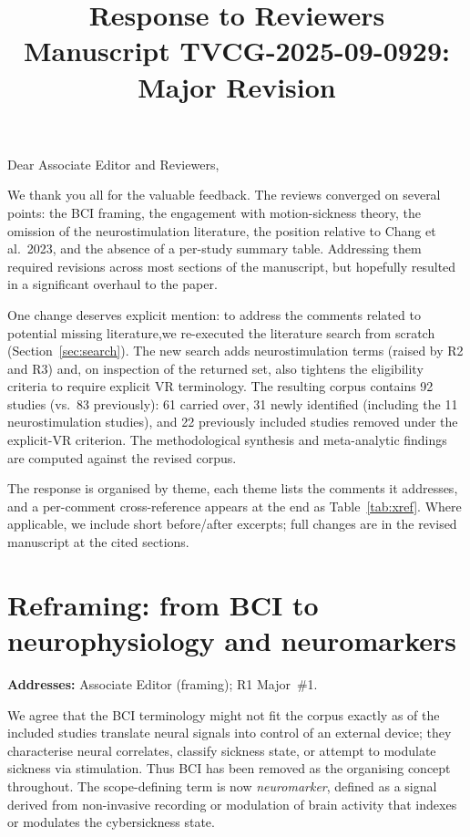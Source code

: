\documentclass[11pt,a4paper]{article}
\title{\vspace{-2em}Response to Reviewers\\[0.3em]
  \large Manuscript TVCG-2025-09-0929: Major Revision}
\author{}
\date{}
\newcommand{\addresses}[1]{\par\noindent\textbf{\small Addresses:} {\small #1}\par\smallskip}
\begin{document}
\maketitle
\vspace{-3em}

\noindent Dear Associate Editor and Reviewers,\medskip

\noindent We thank you all for the valuable feedback. The reviews converged on several points: the BCI framing, the engagement with motion-sickness theory, the omission of the neurostimulation literature, the position relative to Chang et al.\ 2023, and the absence of a per-study summary table. Addressing them required revisions across most sections of the manuscript, but hopefully resulted in a significant overhaul to the paper.

\noindent One change deserves explicit mention: to address the comments related to potential missing literature,we re-executed the literature search from scratch (Section~\ref{sec:search}). The new search adds neurostimulation terms (raised by R2 and R3) and, on inspection of the returned set, also tightens the eligibility criteria to require explicit VR terminology. The resulting corpus contains 92 studies (vs.\ 83 previously): 61 carried over, 31 newly identified (including the 11 neurostimulation studies), and 22 previously included studies removed under the explicit-VR criterion. The methodological synthesis and meta-analytic findings are computed against the revised corpus.

\noindent The response is organised by theme, each theme lists the comments it addresses, and a per-comment cross-reference appears at the end as Table~\ref{tab:xref}. Where applicable, we include short before/after excerpts; full changes are in the revised manuscript at the cited sections.

\clearpage
\tableofcontents
\clearpage
\bigskip

\section{Reframing: from BCI to neurophysiology and neuromarkers}\label{sec:framing}
\addresses{Associate Editor (framing); R1 Major~\#1.}

We agree that the BCI terminology might not fit the corpus exactly as of the included studies translate neural signals into control of an external device; they characterise neural correlates, classify sickness state, or attempt to modulate sickness via stimulation. Thus BCI has been removed as the organising concept throughout. The scope-defining term is now \emph{neuromarker}, defined as a signal derived from non-invasive recording or modulation of brain activity that indexes or modulates the cybersickness state.
\end{document}
